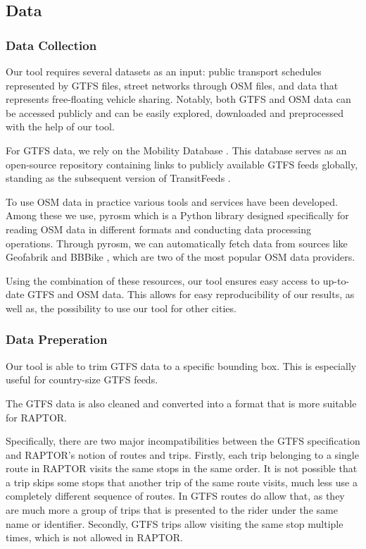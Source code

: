\subsection{Data}
\label{subs:data}

\subsubsection{Data Collection}
\label{subs:data_collection}

Our tool requires several datasets as an input: public transport schedules represented by GTFS files, street networks through OSM files, and data that represents free-floating vehicle sharing.
Notably, both GTFS and OSM data can be accessed publicly and can be easily explored, downloaded and preprocessed with the help of our tool.

For GTFS data, we rely on the Mobility Database .
This database serves as an open-source repository containing links to publicly available GTFS feeds globally, standing as the subsequent version of TransitFeeds .

To use OSM data in practice various tools and services have been developed.
Among these we use, pyrosm  which is a Python library designed specifically for reading OSM data in different formats and conducting data processing operations.
Through pyrosm, we can automatically fetch data from sources like Geofabrik \cite{GeofabrikDownloadServer} and BBBike \cite{BBBikeExtractsOpenStreetMap}, which are two of the most popular OSM data providers.

Using the combination of these resources, our tool ensures easy access to up-to-date GTFS and OSM data.
This allows for easy reproducibility of our results, as well as, the possibility to use our tool for other cities.

\subsubsection{Data Preperation}
\label{subs:data_preperation}

Our tool is able to trim GTFS data to a specific bounding box.
This is especially useful for country-size GTFS feeds.

The GTFS data is also cleaned and converted into a format that is more suitable for RAPTOR.

Specifically, there are two major incompatibilities between the GTFS specification and RAPTOR's notion of routes and trips.
Firstly, each trip belonging to a single route in RAPTOR visits the same stops in the same order.
It is not possible that a trip skips some stops that another trip of the same route visits, much less use a completely different sequence of routes.
In GTFS routes do allow that, as they are much more a group of trips that is presented to the rider under the same name or identifier.
Secondly, GTFS trips allow visiting the same stop multiple times, which is not allowed in RAPTOR.

